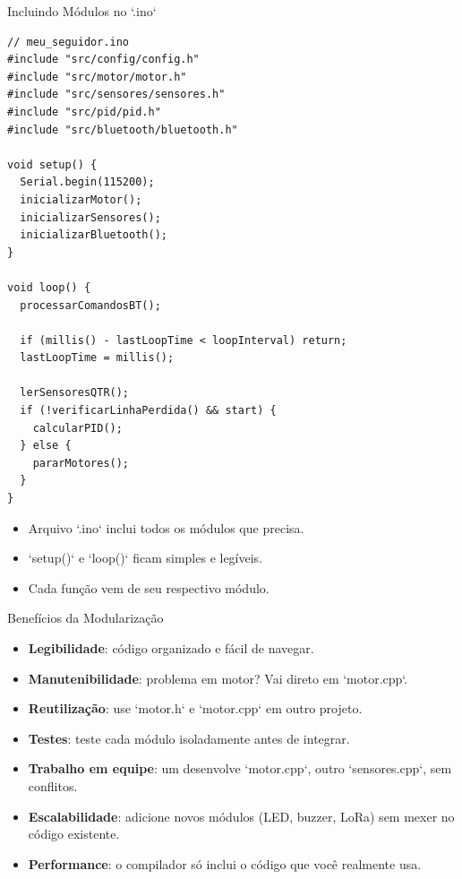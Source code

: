 \documentclass[10pt]{beamer}
\begin{document}
\begin{frame}[fragile]{Incluindo Módulos no `.ino`}
\begin{lstlisting}
// meu_seguidor.ino
#include "src/config/config.h"
#include "src/motor/motor.h"
#include "src/sensores/sensores.h"
#include "src/pid/pid.h"
#include "src/bluetooth/bluetooth.h"

void setup() {
  Serial.begin(115200);
  inicializarMotor();
  inicializarSensores();
  inicializarBluetooth();
}

void loop() {
  processarComandosBT();
  
  if (millis() - lastLoopTime < loopInterval) return;
  lastLoopTime = millis();
  
  lerSensoresQTR();
  if (!verificarLinhaPerdida() && start) {
    calcularPID();
  } else {
    pararMotores();
  }
}
\end{lstlisting}

  \begin{itemize}
    \item Arquivo `.ino` inclui todos os módulos que precisa.
    \item `setup()` e `loop()` ficam simples e legíveis.
    \item Cada função vem de seu respectivo módulo.
  \end{itemize}
\end{frame}

\begin{frame}{Benefícios da Modularização}
  \begin{itemize}
    \item \textbf{Legibilidade}: código organizado e fácil de navegar.
    \item \textbf{Manutenibilidade}: problema em motor? Vai direto em `motor.cpp`.
    \item \textbf{Reutilização}: use `motor.h` e `motor.cpp` em outro projeto.
    \item \textbf{Testes}: teste cada módulo isoladamente antes de integrar.
    \item \textbf{Trabalho em equipe}: um desenvolve `motor.cpp`, outro `sensores.cpp`, sem conflitos.
    \item \textbf{Escalabilidade}: adicione novos módulos (LED, buzzer, LoRa) sem mexer no código existente.
    \item \textbf{Performance}: o compilador só inclui o código que você realmente usa.
  \end{itemize}
\end{frame}
\end{document}
